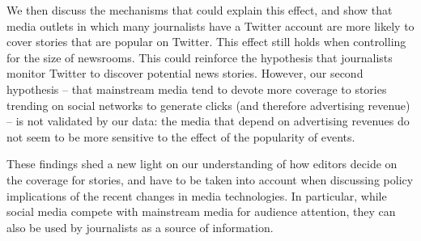 We then discuss the mechanisms that could explain this effect, and show that media outlets in which many journalists have a Twitter account are more likely to cover stories that are popular on Twitter. This effect still holds when controlling for the size of newsrooms. This could reinforce the hypothesis that journalists monitor Twitter to discover potential news stories. However, our second hypothesis -- that mainstream media tend to devote more coverage to stories trending on social networks to generate clicks (and therefore advertising revenue) -- is not validated by our data: the media that depend on advertising revenues do not seem to be more sensitive to the effect of the popularity of events.

These findings shed a new light on our understanding of how editors decide on the coverage for stories, and have to be taken into account when discussing policy implications of the recent changes in media technologies. In particular, while social media compete with mainstream media for audience attention, they can also be used by journalists as a source of information.
